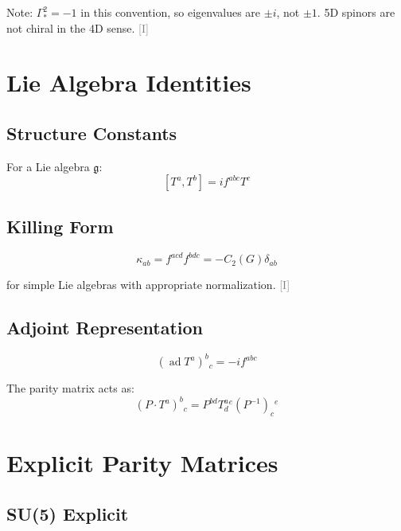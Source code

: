\documentclass[11pt,a4paper]{article}
\newcommand{\tagI}{\textcolor{gray}{[I]}}
\DeclareMathOperator{\ad}{ad}
\begin{document}
Note: $\Gamma_*^2 = -1$ in this convention, so eigenvalues are $\pm i$, not $\pm 1$.
5D spinors are not chiral in the 4D sense. \tagI

\section{Lie Algebra Identities}
\label{app:lie}

\subsection{Structure Constants}

For a Lie algebra $\mathfrak{g}$:
\begin{equation}
\label{eq:structure}
[T^a, T^b] = i f^{abc} T^c
\end{equation}

\subsection{Killing Form}

\begin{equation}
\label{eq:killing}
\kappa_{ab} = f^{acd} f^{bdc} = -C_2(G) \delta_{ab}
\end{equation}

for simple Lie algebras with appropriate normalization. \tagI

\subsection{Adjoint Representation}

\begin{equation}
\label{eq:adjoint}
(\ad T^a)^b{}_c = -i f^{abc}
\end{equation}

The parity matrix acts as:
\begin{equation}
\label{eq:parity-adjoint}
(P \cdot T^a)^b{}_c = P^{bd} T^a_d{}^e (P^{-1})^{}_c{}^e
\end{equation}

\section{Explicit Parity Matrices}
\label{app:explicit-parity}

\subsection{SU(5) Explicit}
\end{document}
